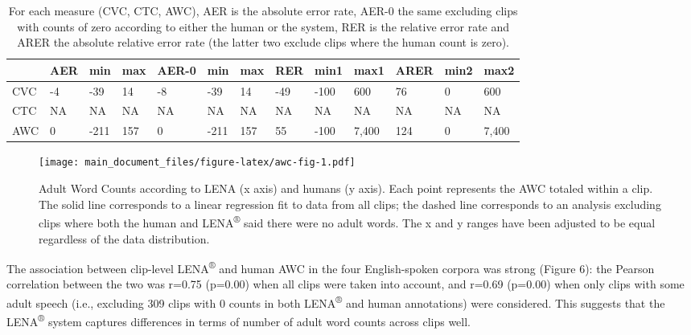 \documentclass[english,table,man,floatsintext]{apa6}
\begin{document}
\begin{table}[tbp]

\begin{center}
\begin{threeparttable}

\caption{\label{tab:tabrers}For each measure (CVC, CTC, AWC), AER is the absolute error rate, AER-0 the same excluding clips with counts of zero according to either the human or the system, RER is the relative error rate and ARER the absolute relative error rate (the latter two exclude clips where the human count is zero). }

\begin{tabular}{lllllllllllll}
\toprule
 & \multicolumn{1}{c}{AER} & \multicolumn{1}{c}{min} & \multicolumn{1}{c}{max} & \multicolumn{1}{c}{AER-0} & \multicolumn{1}{c}{min} & \multicolumn{1}{c}{max} & \multicolumn{1}{c}{RER} & \multicolumn{1}{c}{min1} & \multicolumn{1}{c}{max1} & \multicolumn{1}{c}{ARER} & \multicolumn{1}{c}{min2} & \multicolumn{1}{c}{max2}\\
\midrule
CVC & -4 & -39 & 14 & -8 & -39 & 14 & -49 & -100 & 600 & 76 & 0 & 600\\
CTC & NA & NA & NA & NA & NA & NA & NA & NA & NA & NA & NA & NA\\
AWC & 0 & -211 & 157 & 0 & -211 & 157 & 55 & -100 & 7,400 & 124 & 0 & 7,400\\
\bottomrule
\end{tabular}

\end{threeparttable}
\end{center}

\end{table}

\begin{figure}
\centering
\texttt{[image: main\_document\_files/figure-latex/awc-fig-1.pdf]}
\caption{\label{fig:awc-fig}Adult Word Counts according to LENA (x axis) and humans (y axis). Each point represents the AWC totaled within a clip. The solid line corresponds to a linear regression fit to data from all clips; the dashed line corresponds to an analysis excluding clips where both the human and LENA\textsuperscript{®} said there were no adult words. The x and y ranges have been adjusted to be equal regardless of the data distribution.}
\end{figure}

The association between clip-level LENA\textsuperscript{®} and human AWC in the four English-spoken corpora was strong (Figure 6): the Pearson correlation between the two was r=0.75 (p=0.00) when all clips were taken into account, and r=0.69 (p=0.00) when only clips with some adult speech (i.e., excluding 309 clips with 0 counts in both LENA\textsuperscript{®} and human annotations) were considered. This suggests that the LENA\textsuperscript{®} system captures differences in terms of number of adult word counts across clips well.
\end{document}
